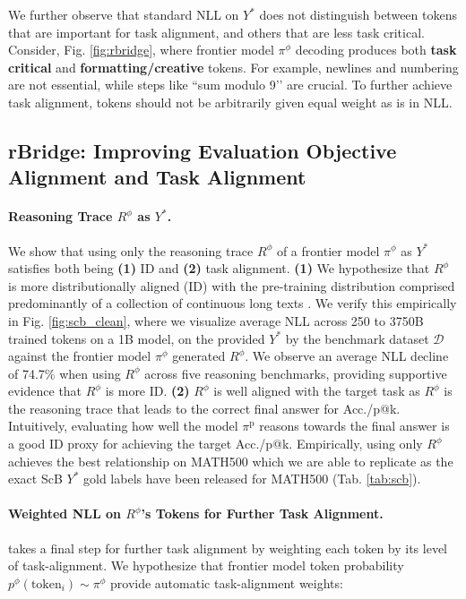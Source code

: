 We further observe that standard NLL on $Y^*$ does not distinguish between tokens that are important for task alignment, and others that are less task critical. Consider, Fig. \ref{fig:rbridge}, where frontier model $\pi^\phi$ decoding produces both {\color{mygreen}\textbf{task critical}} and {\color{myorange}\textbf{formatting/creative}} tokens. For example, newlines and numbering are not essential, while steps like ``sum modulo 9’’ are crucial. To further achieve task alignment, tokens should not be arbitrarily given equal weight as is in NLL. 

\subsection{rBridge: Improving Evaluation Objective Alignment and Task Alignment} \label{sec:align}
  
\paragraph{Reasoning Trace $R^\phi$ as $Y^*$.} We show that using only the reasoning trace $R^\phi$ of a frontier model $\pi^\phi$ as $Y^*$ satisfies both being \textbf{(1)} ID and \textbf{(2)} task alignment. \textbf{(1)} We hypothesize that $R^\phi$ is more distributionally aligned (ID) with the pre-training distribution comprised predominantly of a collection of continuous long texts \citep{NEURIPS2024_370df50c,kydlicek2025finepdfs}. We verify this empirically in Fig. \ref{fig:scb_clean}, where we visualize average NLL across 250 to 3750B trained tokens on a 1B model, on the provided $Y^*$ by the benchmark dataset $\mathcal{D}$ against the frontier model $\pi^\phi$ generated $R^\phi$. We observe an average NLL decline of 74.7\% when using $R^\phi$ across five reasoning benchmarks, providing supportive evidence that $R^\phi$ is more ID. \textbf{(2)} $R^\phi$ is well aligned with the target task as $R^\phi$ is the reasoning trace that leads to the correct final answer for Acc./p@k. Intuitively, evaluating how well the model $\pi^\text{p}$ reasons towards the final answer is a good ID proxy for achieving the target Acc./p@k. Empirically, using only $R^\phi$ achieves the best relationship on MATH500 which we are able to replicate as the exact ScB $Y^*$ gold labels have been released for MATH500 (Tab. \ref{tab:scb}).  


\paragraph{Weighted NLL on $R^\phi$'s Tokens for 
Further Task Alignment.}  takes a final step for further task alignment by weighting each token by its level of task-alignment. We hypothesize that frontier model token probability $p^\phi(\text{token}_i) \sim \pi^\phi$ provide automatic task-alignment weights:

